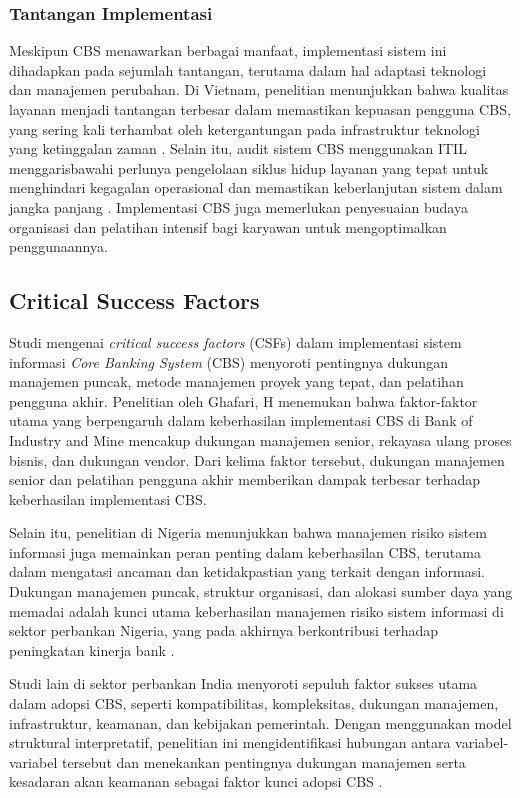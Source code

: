 \documentclass[journal,article,submit,pdftex,moreauthors]{Definitions/mdpi}
\begin{document}
\subsubsection{Tantangan Implementasi}

Meskipun CBS menawarkan berbagai manfaat, implementasi sistem ini dihadapkan pada sejumlah tantangan, terutama dalam hal adaptasi teknologi dan manajemen perubahan. Di Vietnam, penelitian menunjukkan bahwa kualitas layanan menjadi tantangan terbesar dalam memastikan kepuasan pengguna CBS, yang sering kali terhambat oleh ketergantungan pada infrastruktur teknologi yang ketinggalan zaman \cite{Hsiao-ebanking}. Selain itu, audit sistem CBS menggunakan ITIL menggarisbawahi perlunya pengelolaan siklus hidup layanan yang tepat untuk menghindari kegagalan operasional dan memastikan keberlanjutan sistem dalam jangka panjang \cite{wahyudi-cbs}. Implementasi CBS juga memerlukan penyesuaian budaya organisasi dan pelatihan intensif bagi karyawan untuk mengoptimalkan penggunaannya.

\subsection{Critical Success Factors}

Studi mengenai \textit{critical success factors} (CSFs) dalam implementasi sistem informasi \textit{Core Banking System} (CBS) menyoroti pentingnya dukungan manajemen puncak, metode manajemen proyek yang tepat, dan pelatihan pengguna akhir. Penelitian oleh Ghafari, H \cite{Ghafari-csf} menemukan bahwa faktor-faktor utama yang berpengaruh dalam keberhasilan implementasi CBS di Bank of Industry and Mine mencakup dukungan manajemen senior, rekayasa ulang proses bisnis, dan dukungan vendor. Dari kelima faktor tersebut, dukungan manajemen senior dan pelatihan pengguna akhir memberikan dampak terbesar terhadap keberhasilan implementasi CBS.

Selain itu, penelitian di Nigeria menunjukkan bahwa manajemen risiko sistem informasi juga memainkan peran penting dalam keberhasilan CBS, terutama dalam mengatasi ancaman dan ketidakpastian yang terkait dengan informasi. Dukungan manajemen puncak, struktur organisasi, dan alokasi sumber daya yang memadai adalah kunci utama keberhasilan manajemen risiko sistem informasi di sektor perbankan Nigeria, yang pada akhirnya berkontribusi terhadap peningkatan kinerja bank \cite{falisat-csf}.

Studi lain \cite{salu-csf} di sektor perbankan India menyoroti sepuluh faktor sukses utama dalam adopsi CBS, seperti kompatibilitas, kompleksitas, dukungan manajemen, infrastruktur, keamanan, dan kebijakan pemerintah. Dengan menggunakan model struktural interpretatif, penelitian ini mengidentifikasi hubungan antara variabel-variabel tersebut dan menekankan pentingnya dukungan manajemen serta kesadaran akan keamanan sebagai faktor kunci adopsi CBS \cite{salu-csf}.
\end{document}
